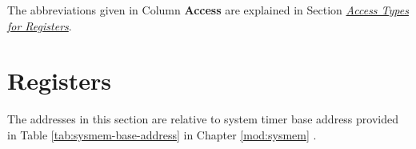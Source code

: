 \documentclass[main\_\_EN.tex]{subfiles}
\begin{document}
The abbreviations given in Column \textbf{Access} are explained in Section \hyperref[glossary-access-types]{\textit{Access Types for Registers}}.






\clearpage
\section{Registers}

The addresses in this section are relative to system timer base address provided in Table \ref{tab:sysmem-base-address} in Chapter \ref{mod:sysmem} \textit{}.


\end{document}
